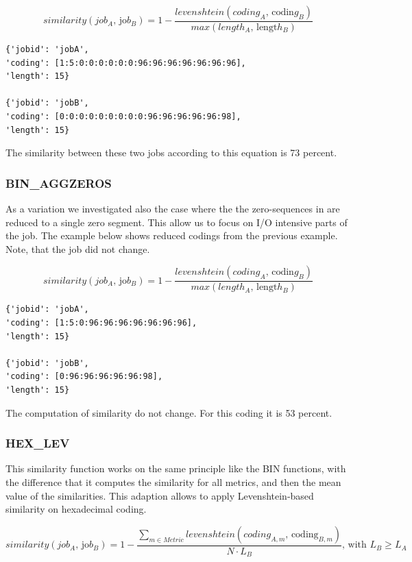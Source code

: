 \documentclass[]{llncs}
\begin{document}
\begin{equation}
similarity \left( job_{A}\text{, jo}b_{B} \right) =1- \frac{levenshtein \left( coding_{A}\text{, codin}g_{B} \right) }{max \left( length_{A}\text{, lengt}h_{B} \right) }
\end{equation}

\begin{lstlisting}
{'jobid': 'jobA',
'coding': [1:5:0:0:0:0:0:0:96:96:96:96:96:96:96],
'length': 15} 

{'jobid': 'jobB',
'coding': [0:0:0:0:0:0:0:0:0:96:96:96:96:96:98],
'length': 15}
\end{lstlisting}

The similarity between these two jobs according to this equation is 73 percent.

\subsubsection{BIN\_AGGZEROS}
As a variation we investigated also the case where the the zero-sequences in are reduced to a single zero segment. This allow us to focus on I/O intensive parts of the job. The example below shows reduced codings from the previous example. Note, that the job did not change.

\begin{equation}
similarity \left( job_{A}\text{, jo}b_{B} \right) =1- \frac{levenshtein \left( coding_{A}\text{, codin}g_{B} \right) }{max \left( length_{A}\text{, lengt}h_{B} \right) }
\end{equation}

\begin{lstlisting}
{'jobid': 'jobA',
'coding': [1:5:0:96:96:96:96:96:96:96],
'length': 15}

{'jobid': 'jobB',
'coding': [0:96:96:96:96:96:98],
'length': 15}
\end{lstlisting}

The computation of similarity do not change.
For this coding it is 53 percent.


\subsubsection{HEX\_LEV}
This similarity function works on the same principle like the BIN functions, with the difference that it computes the similarity for all metrics, and then the mean value of the similarities.
This adaption allows to apply Levenshtein-based similarity on hexadecimal coding.

\begin{equation}
  similarity \left( job_{A}\text{, jo}b_{B} \right) =1-\frac{ \sum_{m \in Metric}^{} levenshtein \left( coding_{A,m}\text{, coding}_{B,m} \right) }{N \cdot L_{B}} \text{, with }L_{B} \geq L_{A}
\end{equation}
\end{document}
